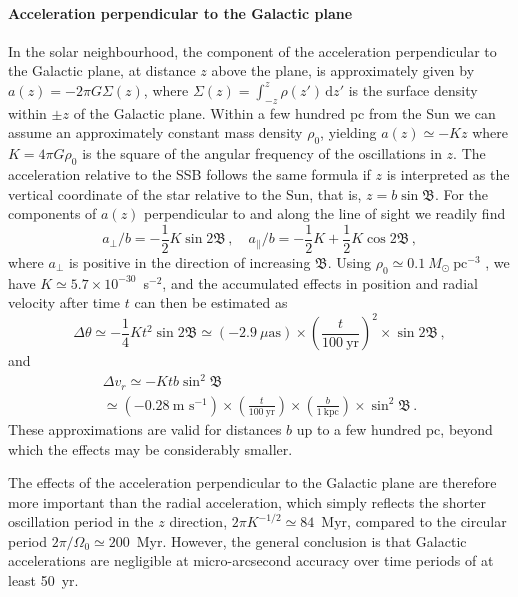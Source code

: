 \documentclass{aa}
\newcommand{\glat}{\mathfrak{B}}
\begin{document}
\paragraph{Acceleration perpendicular to the Galactic plane}
In the solar neighbourhood, the component of the acceleration perpendicular to the
Galactic plane, at distance $z$ above the plane, is approximately given by
$a(z) = -2\pi G\Sigma(z)$, where $\Sigma(z)=\int_{-z}^z\rho(z')\,\text{d}z'$
is the surface density within $\pm z$ of the Galactic plane. Within a few hundred pc
from the Sun we can assume an approximately constant mass density $\rho_0$,
yielding $a(z)\simeq -Kz$ where $K=4\pi G\rho_0$ is the square of the angular
frequency of the oscillations in $z$. The acceleration relative to the
SSB follows the same formula if $z$ is interpreted as the vertical coordinate of
the star relative to the Sun, that is, $z=b\sin\glat$. For the components of $a(z)$
perpendicular to and along the line of sight we readily find
\begin{equation}\label{eq:az}
a_\perp/b = -{\textstyle\frac{1}{2}}K \sin 2\glat \, , \quad
a_\parallel/b = -{\textstyle\frac{1}{2}}K + {\textstyle\frac{1}{2}}K\cos 2\glat \, ,
\end{equation}
where $a_\perp$ is positive in the direction of increasing $\glat$.
Using $\rho_0\simeq 0.1~M_\odot~\text{pc}^{-3}$ \citep{holmberg+flynn2000},
we have $K\simeq 5.7\times 10^{-30}$~s$^{-2}$, and the accumulated
effects in position and radial velocity after time $t$ can then be estimated as
\begin{equation}
\Delta\theta \simeq -\frac{1}{4} K t^2 \sin 2\glat \simeq
(-2.9~\mu\text{as})\times\left(\frac{t}{100~\text{yr}}\right)^2\times\sin 2\glat \, ,
\end{equation}
and
\begin{multline}
\Delta v_r \simeq -K t b \sin^2\glat \\
\simeq (-0.28~\text{m~s}^{-1})\times\left(\frac{t}{100~\text{yr}}\right)\times
\left(\frac{b}{1~\text{kpc}}\right)\times \sin^2\glat \, .
\end{multline}
These approximations are valid for distances $b$ up to a few hundred pc,
beyond which the effects may be considerably smaller.

The effects of the acceleration perpendicular to the Galactic plane are therefore
more important than the radial acceleration, which simply reflects the shorter
oscillation period in the $z$ direction, $2\pi K^{-1/2}\simeq 84$~Myr,
compared to the circular period $2\pi/\Omega_0\simeq 200$~Myr.
However, the general conclusion is that Galactic accelerations are negligible at
micro-arcsecond accuracy over time periods of at least 50~yr.
\end{document}
